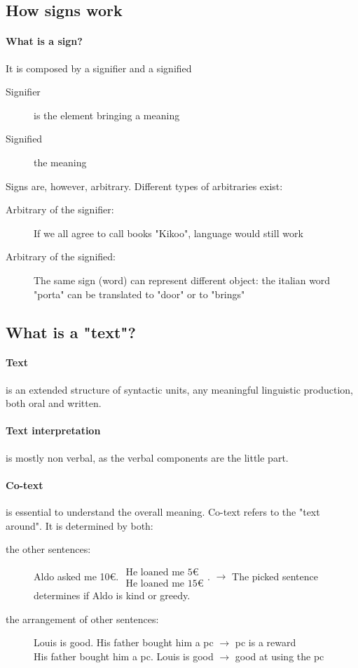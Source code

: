 \documentclass{article}
\begin{document}
\subsection{How signs work}
\label{subsec:singAndAmbiguity}
\paragraph{What is a sign?} It is composed by a signifier and a signified
\begin{description}
\item[Signifier] is the element bringing a meaning
\item[Signified] the meaning
\end{description}
Signs are, however, arbitrary. Different types of arbitraries exist:
\begin{description}
\item[Arbitrary of the signifier:] If we all agree to call books "Kikoo", language would still work
\item[Arbitrary of the signified:] The same sign (word) can represent different object: the italian word "porta" can be translated to "door" or to "brings"
\end{description}

\subsection{What is a "text"?}
\paragraph{Text} is an extended structure of syntactic units, any meaningful linguistic production, both oral and written.\\
\paragraph{Text interpretation} is mostly non verbal, as the verbal components are the little part.
\paragraph{Co-text}  is essential to understand the overall meaning. Co-text refers to the "text around". It is determined by both:
\begin{description}
\item[the other sentences:] Aldo asked me 10€. $\substack{\text{He loaned me 5€}\\\text{He loaned me 15€}}$. $\rightarrow$ The picked sentence determines if Aldo is kind or greedy.
\item[the arrangement of other sentences:] Louis is good. His father bought him a pc $\rightarrow$ pc is a reward\\
His father bought him a pc. Louis is good $\rightarrow$ good at using the pc
\end{description}
\end{document}
